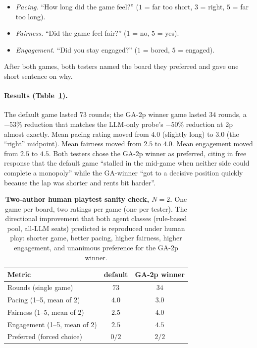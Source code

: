 \documentclass[10pt]{article}
\begin{document}
\begin{itemize}[leftmargin=1.2em,itemsep=0pt]
\item \emph{Pacing.} ``How long did the game feel?''
  ($1$ = far too short, $3$ = right, $5$ = far too long).
\item \emph{Fairness.} ``Did the game feel fair?''
  ($1$ = no, $5$ = yes).
\item \emph{Engagement.} ``Did you stay engaged?''
  ($1$ = bored, $5$ = engaged).
\end{itemize}

\noindent After both games, both testers named the board they
preferred and gave one short sentence on why.

\paragraph{Results (Table~\ref{tab:playtest}).} The default game
lasted $73$ rounds; the GA-2p winner game lasted $34$ rounds, a
$-53\%$ reduction that matches the LLM-only probe's $-50\%$
reduction at 2p almost exactly. Mean pacing rating moved from
$4.0$ (slightly long) to $3.0$ (the ``right'' midpoint). Mean
fairness moved from $2.5$ to $4.0$. Mean engagement moved from
$2.5$ to $4.5$. Both testers chose the GA-2p winner as preferred,
citing in free response that the default game ``stalled in the
mid-game when neither side could complete a monopoly'' while the
GA-winner ``got to a decisive position quickly because the lap
was shorter and rents bit harder''.

\begin{table}[h!]
\centering
\small
\begin{tabular}{lcc}
\toprule
Metric & default & GA-2p winner \\
\midrule
Rounds (single game)              & $73$  & $34$  \\
Pacing (1--5, mean of $2$)         & $4.0$ & $3.0$ \\
Fairness (1--5, mean of $2$)       & $2.5$ & $4.0$ \\
Engagement (1--5, mean of $2$)     & $2.5$ & $4.5$ \\
\midrule
Preferred (forced choice)          & $0/2$ & $2/2$ \\
\bottomrule
\end{tabular}
\caption{\textbf{Two-author human playtest sanity check, $N{=}2$.}
One game per board, two ratings per game (one per tester). The
directional improvement that both agent classes (rule-based pool,
all-LLM seats) predicted is reproduced under human play: shorter
game, better pacing, higher fairness, higher engagement, and
unanimous preference for the GA-2p winner.}
\label{tab:playtest}
\end{table}
\end{document}
